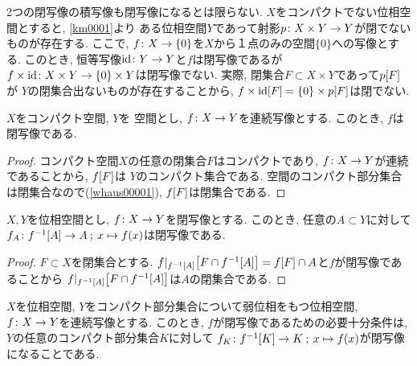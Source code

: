 \documentclass[uplatex, dvipdfmx, a4paper, 12pt, class=jsbook, crop=false]{standalone}
\begin{document}
\begin{example}
	2つの閉写像の積写像も閉写像になるとは限らない.
	$ X $をコンパクトでない位相空間とすると, \cref{km0001}より
	ある位相空間$ Y $であって射影$ p\colon X \times Y\to Y $が閉でないものが存在する.
	ここで, $ f\colon X\to\{0\} $を$ X $から１点のみの空間$ \{0\} $への写像とする.
	このとき, 恒等写像$ \mathrm{id}\colon Y\to Y $と$ f $は閉写像であるが
	$ f \times \mathrm{id}\colon X \times Y\to\{0\} \times Y $は閉写像でない.
	実際, 閉集合$ F \subset X \times Y $であって$ \mapset{p}{F} $が
	$ Y $の閉集合出ないものが存在することから,
	$ \mapset{f \times \identity}{F} = \{0\} \times \mapset{p}{F} $は閉でない.
\end{example}

\begin{proposition}
	$ X $をコンパクト空間, $ Y $を \Hausdorff 空間とし, $ f\colon X\to Y $を連続写像とする.
	このとき, $ f $は閉写像である.
\end{proposition}

\begin{proof}
	コンパクト空間$ X $の任意の閉集合$ F $はコンパクトであり,
	$ f\colon X\to Y $が連続であることから, $ \mapset{f}{F} $は
	$ Y $のコンパクト集合である.
	\Hausdorff 空間のコンパクト部分集合は閉集合なので(\cref{whaus00001}),
	$ \mapset{f}{F} $は閉集合である.
\end{proof}

\begin{proposition}
	\label{c00002}
	$ X, Y $を位相空間とし, $ f\colon X\to Y $を閉写像とする.
	このとき, 任意の$ A \subset Y $に対して
	$ \morphto{f_A}{\mapinvset{f}{A}}{A}{x}{f(x)} $は閉写像である.
\end{proposition}

\begin{proof}
	$ F \subset X $を閉集合とする.
	$ \mapset{f|_{\mapinvset{f}{A}}}{F \cap \mapinvset{f}{A}}
	= \mapset{f}{F} \cap A $と$ f $が閉写像であることから
	$ \mapset{f|_{\mapinvset{f}{A}}}{F \cap \mapinvset{f}{A}} $は$ A $の閉集合である.
\end{proof}

\begin{proposition}
	$ X $を位相空間, $ Y $をコンパクト部分集合について弱位相をもつ位相空間,
	$ f\colon X\to Y $を連続写像とする.
	このとき, $ f $が閉写像であるための必要十分条件は, $ Y $の任意のコンパクト部分集合$ K $に対して
	$ \morphto{f_K}{\mapinvset{f}{K}}{K}{x}{f(x)} $が閉写像になることである.
\end{proposition}
\end{document}
